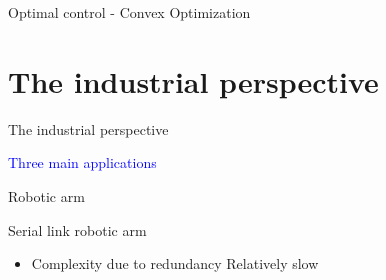 \documentclass[usenames,dvipsnames,xcolor=table]{beamer}
\begin{document}

\begin{frame}{Optimal control - Convex Optimization}
\begin{center}
\end{center}
\end{frame}




\section{The industrial perspective}


\begin{frame}{The industrial perspective}
\begin{center}
    \Large{\textcolor{blue}{Three main applications}}
    \def\svgwidth{\linewidth}
    
\end{center}
\end{frame}


\begin{frame}{Robotic arm}
    \begin{center}
        \begin{minipage}{0.49\linewidth}
                \def\svgwidth{0.7\linewidth}
                
        \end{minipage}
        \hfill
        \begin{minipage}{0.49\linewidth}
        \large{Serial link robotic arm}
        \begin{itemize}
            \pro Large work-space
            \pro Versatility
            \item[]
            \con Complexity due to redundancy
            \con Relatively slow
        \end{itemize}
        \end{minipage}
    \end{center}
\end{frame}
\end{document}

